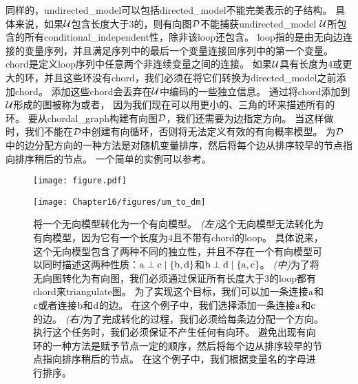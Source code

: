 同样的，\gls{undirected_model}可以包括\gls{directed_model}不能完美表示的子结构。
具体来说，如果$\mathcal{U}$包含长度大于$3$的，则有向图$\mathcal{D}$不能捕获\gls{undirected_model} $\mathcal{U}$所包含的所有\gls{conditional_independent}性，除非该\gls{loop}还包含。
\gls{loop}指的是由无向边连接的变量序列，并且满足序列中的最后一个变量连接回序列中的第一个变量。
\gls{chord}是定义\gls{loop}序列中任意两个非连续变量之间的连接。
如果$\mathcal{U}$具有长度为$4$或更大的环，并且这些环没有\gls{chord}，我们必须在将它们转换为\gls{directed_model}之前添加\gls{chord}。
添加这些\gls{chord}会丢弃在$\mathcal{U}$中编码的一些独立信息。
通过将\gls{chord}添加到$\mathcal{U}$形成的图被称为或者，
因为我们现在可以用更小的、三角的环来描述所有的环。
要从\gls{chordal_graph}构建有向图$\mathcal{D}$，我们还需要为边指定方向。
当这样做时，我们不能在$\mathcal{D}$中创建有向循环，否则将无法定义有效的有向概率模型。
为$\mathcal{D}$中的边分配方向的一种方法是对随机变量排序，然后将每个边从排序较早的节点指向排序稍后的节点。
一个简单的实例可以参考。



\begin{figure}[!htb]
\ifOpenSource
\centerline{\texttt{[image: figure.pdf]}}
\else
	\centerline{\texttt{[image: Chapter16/figures/um\_to\_dm]}}	
\fi
\caption{将一个无向模型转化为一个有向模型。
\emph{(左)}这个无向模型无法转化为有向模型，因为它有一个长度为$4$且不带有\gls{chord}的\gls{loop}。
具体说来，这个无向模型包含了两种不同的独立性，并且不存在一个有向模型可以同时描述这两种性质：$\mathrm{a}\perp \mathrm{c} \mid \{\mathrm{b},\mathrm{d}\}$和$\mathrm{b} \perp \mathrm{d} \mid \{\mathrm{a},\mathrm{c}\}$。
\emph{(中)}为了将无向图转化为有向图，我们必须通过保证所有长度大于$3$的\gls{loop}都有\gls{chord}来\gls{triangulate}图。
为了实现这个目标，我们可以加一条连接$\mathrm{a}$和$\mathrm{c}$或者连接$\mathrm{b}$和$\mathrm{d}$的边。
在这个例子中，我们选择添加一条连接$\mathrm{a}$和$\mathrm{c}$的边。
\emph{(右)}为了完成转化的过程，我们必须给每条边分配一个方向。
执行这个任务时，我们必须保证不产生任何有向环。
避免出现有向环的一种方法是赋予节点一定的顺序，然后将每个边从排序较早的节点指向排序稍后的节点。
在这个例子中，我们根据变量名的字母进行排序。}
	\label{fig:um_to_dm}
\end{figure}



\subsection{}
\label{sec:factor_graphs}



